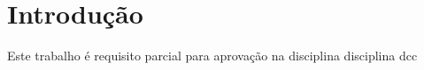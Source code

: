 \section{Introdução}

Este trabalho é requisito parcial para aprovação na disciplina \gls{disciplina} \gls{dcc} \cite{a}